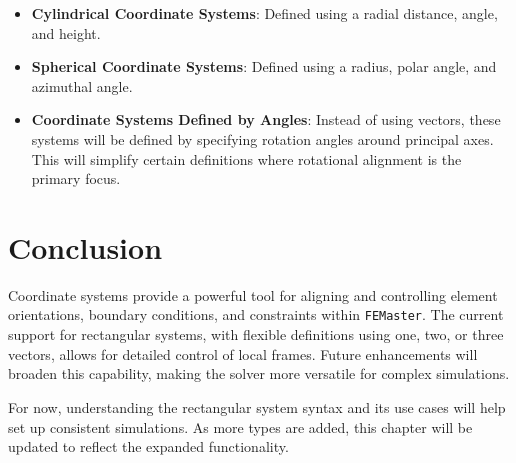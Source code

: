 \begin{itemize}
    \item \textbf{Cylindrical Coordinate Systems}: Defined using a radial distance, angle, and height.
    \item \textbf{Spherical Coordinate Systems}: Defined using a radius, polar angle, and azimuthal angle.
    \item \textbf{Coordinate Systems Defined by Angles}: Instead of using vectors, these systems will be defined by specifying rotation angles around principal axes. This will simplify certain definitions where rotational alignment is the primary focus.
\end{itemize}

\section{Conclusion}

Coordinate systems provide a powerful tool for aligning and controlling element orientations, boundary conditions, and constraints within \texttt{FEMaster}. The current support for rectangular systems, with flexible definitions using one, two, or three vectors, allows for detailed control of local frames. Future enhancements will broaden this capability, making the solver more versatile for complex simulations.

For now, understanding the rectangular system syntax and its use cases will help set up consistent simulations. As more types are added, this chapter will be updated to reflect the expanded functionality.
